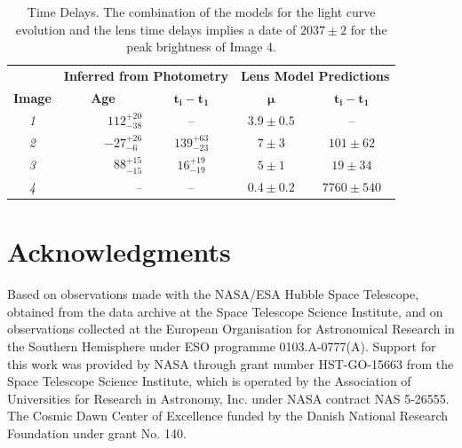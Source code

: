 \documentclass[12pt,dvipsnames]{article}
\begin{document}
\clearpage

\begin{table}
\centering
\begin{tabular}{crc|cc}
    \multicolumn{1}{c}{}&
    \multicolumn{2}{c}{\textbf{Inferred from Photometry}}&\multicolumn{2}{c}{\textbf{Lens Model Predictions}}\\
    \multicolumn{1}{c}{\textbf{Image}} &\multicolumn{1}{c}{\textbf{Age}} &\multicolumn{1}{c}{$\mathbf{t_i-t_1}$}&\multicolumn{1}{c}{$\mathbf{\mu}$}
    &\multicolumn{1}{c}{$\mathbf{t_i-t_1}$}\\
    
\midrule
\textit{1}  & $112^{+20}_{-38}$ & -- & $3.9\pm0.5$ & --\\
\textit{2} & $-27^{+26}_{-6}$ & $139^{+63}_{-23}$ & $7\pm3$ & $101\pm62$ \\
\textit{3} & $88^{+15}_{-15}$ & $16^{+19}_{-19}$ & $5\pm1$ & $19\pm34$ \\
\textit{4} & -- & -- & $0.4\pm0.2$ & $7760\pm540$\\

\end{tabular}
\caption{\label{tab:time_delays}Time Delays.  The combination of the models for the light curve evolution and the lens time delays implies a date of $2037\pm2$ for the peak brightness of Image 4.}
\end{table}










\section*{Acknowledgments}

Based on observations made with the NASA/ESA Hubble Space Telescope, obtained from the data archive at the Space Telescope Science Institute, and on observations collected at the European Organisation for Astronomical Research in the Southern Hemisphere under ESO programme 0103.A-0777(A).  Support for this work was provided by NASA through grant number HST-GO-15663 from the Space Telescope Science Institute, which is operated by the Association of Universities for Research in Astronomy, Inc. under NASA contract NAS 5-26555.  The Cosmic Dawn Center of Excellence funded by the Danish National Research Foundation under grant No. 140.
\end{document}
